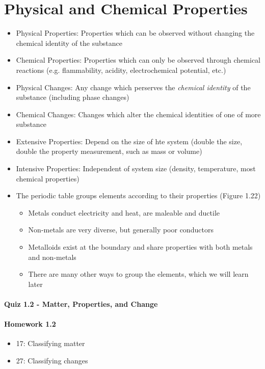 \documentclass[12pt, openany, letterpaper]{memoir}
\begin{document}
\section{Physical and Chemical Properties}
\begin{itemize}
  \item Physical Properties: Properties which can be observed without changing the chemical identity of the substance
  \item Chemical Properties: Properties which can only be observed through chemical reactions (e.g. flammability, acidity, electrochemical potential, etc.)
  \item Physical Changes: Any change which perserves the \emph{chemical identity} of the substance (including phase changes)
  \item Chemical Changes: Changes which alter the chemical identities of one of more substance
  \item Extensive Properties: Depend on the size of hte system (double the size, double the property measurement, such as mass or volume)
  \item Intensive Properties: Independent of system size (density, temperature, most chemical properties)
  \item The periodic table groups elements according to their properties (Figure 1.22)
  \begin{itemize}
    \item Metals conduct electricity and heat, are maleable and ductile
    \item Non-metals are very diverse, but generally poor conductors
    \item Metalloids exist at the boundary and share properties with both metals and non-metals
    \item There are many other ways to group the elements, which we will learn later
  \end{itemize}
\end{itemize}
\paragraph*{Quiz 1.2 - Matter, Properties, and Change}
\paragraph*{Homework 1.2}
\begin{itemize}
  \item 17: Classifying matter
  \item 27: Classifying changes
\end{itemize}
\end{document}
